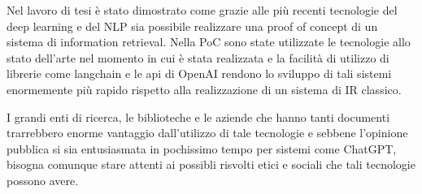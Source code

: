 Nel lavoro di tesi è stato dimostrato come grazie alle più recenti tecnologie del deep learning e del NLP sia possibile realizzare una proof of concept di un sistema di information retrieval.
Nella PoC sono state utilizzate le tecnologie allo stato dell'arte nel momento in cui è stata realizzata e la facilità di utilizzo di librerie come langchain e le api di OpenAI rendono lo sviluppo di tali sistemi enormemente più rapido rispetto alla realizzazione di un sistema di IR classico. 

I grandi enti di ricerca, le biblioteche e le aziende che hanno tanti documenti trarrebbero enorme vantaggio dall'utilizzo di tale tecnologie e sebbene l'opinione pubblica si sia entusiasmata in pochissimo tempo per sistemi come ChatGPT, bisogna comunque stare attenti ai possibli risvolti etici e sociali che tali tecnologie possono avere.